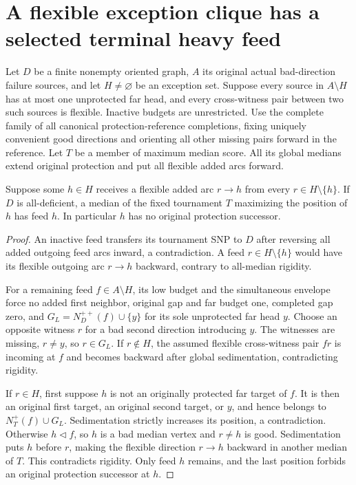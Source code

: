 \section{A flexible exception clique has a selected terminal heavy feed}
\label{sec:flexible-exception-clique-feed}

Let $D$ be a finite nonempty oriented graph, $A$ its original actual
bad-direction failure sources, and let $H\ne\varnothing$ be an
exception set. Suppose every source in $A\setminus H$ has at most
one unprotected far head, and every cross-witness pair between two
such sources is flexible. Inactive budgets are unrestricted.
Use the complete family of all canonical protection-reference
completions, fixing uniquely convenient good directions and orienting
all other missing pairs forward in the reference. Let $T$ be a member
of maximum median score. All its global medians extend original
protection and put all flexible added arcs forward.

\begin{proposition}
\label{prop:inward-flexible-exception-star-feed}
Suppose some $h\in H$ receives a flexible added arc $r\to h$ from
every $r\in H\setminus\{h\}$. If $D$ is all-deficient, a median of
the fixed tournament $T$ maximizing the position of $h$ has feed $h$.
In particular $h$ has no original protection successor.
\end{proposition}
\begin{proof}
An inactive feed transfers its tournament SNP to $D$ after reversing
all added outgoing feed arcs inward, a contradiction. A feed
$r\in H\setminus\{h\}$ would have its flexible outgoing arc
$r\to h$ backward, contrary to all-median rigidity.

For a remaining feed $f\in A\setminus H$, its low budget and the
simultaneous envelope force no added first neighbor, original gap
and far budget one, completed gap zero, and
$G_L=N_D^{++}(f)\cup\{y\}$ for its sole unprotected far head $y$.
Choose an opposite witness $r$ for a bad second direction introducing
$y$. The witnesses are missing, $r\ne y$, so $r\in G_L$.
If $r\notin H$, the assumed flexible cross-witness pair $fr$ is
incoming at $f$ and becomes backward after global sedimentation,
contradicting rigidity.

If $r\in H$, first suppose $h$ is not an originally protected far
target of $f$. It is then an original first target, an original second
target, or $y$, and hence belongs to $N_T^+(f)\cup G_L$.
Sedimentation strictly increases its position, a contradiction.
Otherwise $h\triangleleft f$, so $h$ is a bad median vertex and
$r\ne h$ is good. Sedimentation puts $h$ before $r$, making the
flexible direction $r\to h$ backward in another median of $T$.
This contradicts rigidity. Only feed $h$ remains, and the last
position forbids an original protection successor at $h$.
\end{proof}


